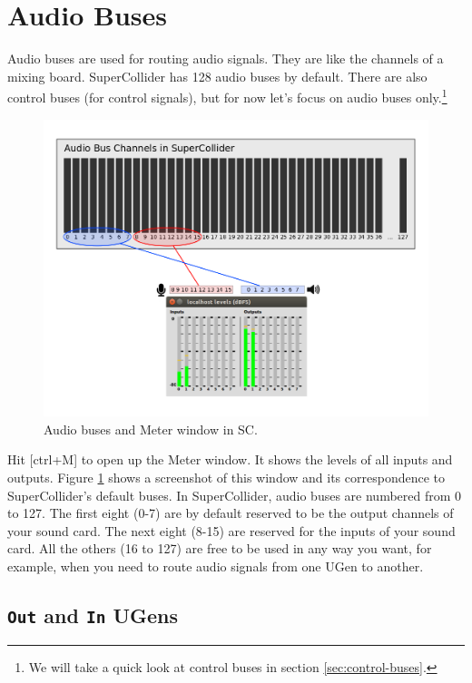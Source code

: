\section{Audio Buses}
\label{sec:audiobus}

Audio buses are used for routing audio signals. They are like the channels of a mixing board. SuperCollider has 128 audio buses by default. There are also control buses (for control signals), but for now let's focus on audio buses only.\footnote{We will take a quick look at control buses in section \ref{sec:control-buses}.}

\begin{figure}[h!]
\centerline{
	\includegraphics[scale=0.4]{fig-audio-bus.png}}
\caption{Audio buses and Meter window in SC.}
\label{fig:audio-bus}
\end{figure}

Hit [ctrl+M] to open up the Meter window. It shows the levels of all inputs and outputs. Figure \ref{fig:audio-bus} shows a screenshot of this window and its correspondence to SuperCollider's default buses. In SuperCollider, audio buses are numbered from 0 to 127. The first eight (0-7) are by default reserved to be the output channels of your sound card. The next eight (8-15) are reserved for the inputs of your sound card. All the others (16 to 127) are free to be used in any way you want, for example, when you need to route audio signals from one UGen to another.

\subsection{\texttt{Out} and \texttt{In} UGens}


